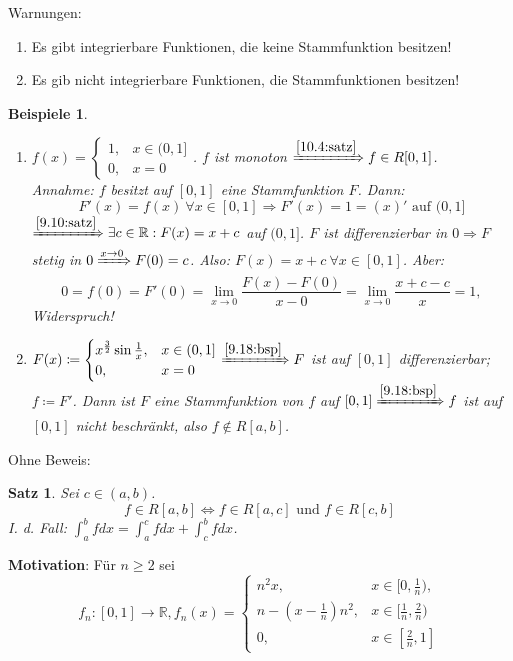 \documentclass[12pt]{extreport} %
\newcommand{\R}{\mathbb{R}}
\theoremstyle{named}
\theoremstyle{dotless}
\newtheorem{satz}[unnamedtheorem]{Satz}
\newtheorem*{beispiele}{Beispiele}
\begin{document}
Warnungen:
\begin{enumerate}
	\item Es gibt integrierbare Funktionen, die keine Stammfunktion besitzen!
	\item Es gib nicht integrierbare Funktionen, die Stammfunktionen besitzen!
\end{enumerate}

\begin{beispiele} ~\
	\begin{enumerate}
		\item $f(x) = \begin{cases} 1, & x \in (0, 1] \\ 0, & x = 0 \end{cases}$. 
			$f$ ist monoton $\xRightarrow[]{\ref{10.4:satz}} f \in R[0, 1]$. \\
			Annahme: $f$ besitzt auf $[0, 1]$ eine Stammfunktion $F$. Dann:
			$$ F'(x) = f(x) ~\forall x \in [0, 1] \Rightarrow F'(x) = 1 = (x)' \text{ auf } (0, 1] $$
			$\xRightarrow[]{\ref{9.10:satz}} \exists c \in \R: F(x) = x + c$ auf $(0, 1]$. $F$ ist differenzierbar in $0 \Rightarrow F$ stetig in $0 \xRightarrow[]{x \rightarrow 0} F(0) = c$. Also: $F(x) = x + c ~\forall x \in [0, 1]$. Aber:
			$$ 0 = f(0) = F'(0) = \lim_{x \rightarrow 0} \frac{F(x) - F(0)}{x - 0} = \lim_{x \rightarrow 0} \frac{x + c - c}{x} = 1, $$
			Widerspruch!
		\item $F(x) \coloneqq \begin{cases} x^{\frac{3}{2}} \sin \frac{1}{x}, & x \in (0, 1] \\ 0, & x = 0 \end{cases} \xRightarrow[]{\ref{9.18:bsp}} F$ ist auf $[0, 1]$ differenzierbar; $f \coloneqq F'$. Dann ist $F$ eine Stammfunktion von $f$ auf $[0, 1] \xRightarrow[]{\ref{9.18:bsp}} f$ ist auf $[0, 1]$ nicht beschränkt, also $f \notin R[a, b]$. 
	\end{enumerate}	
\end{beispiele}

Ohne Beweis:

\begin{satz} \label{10.7:satz}
	Sei $c \in (a, b)$.
	$$  f \in R[a, b] \iff f \in R[a, c] \text{ und } f \in R[c, b] $$	
	I. d. Fall: $\int_{a}^{b} f dx = \int_{a}^{c} f dx + \int_{c}^{b} f dx$. 
\end{satz}


\textbf{Motivation}: Für $n \geq 2$ sei 
	$$f_{n} \colon [0, 1] \rightarrow \R, f_{n}(x) = \begin{cases} n^{2} x, & x \in [0, \frac{1}{n}), \\ n - (x - \frac{1}{n}) n^{2}, & x \in [\frac{1}{n}, \frac{2}{n}) \\ 0, & x \in [\frac{2}{n}, 1] \end{cases} $$
\end{document}
